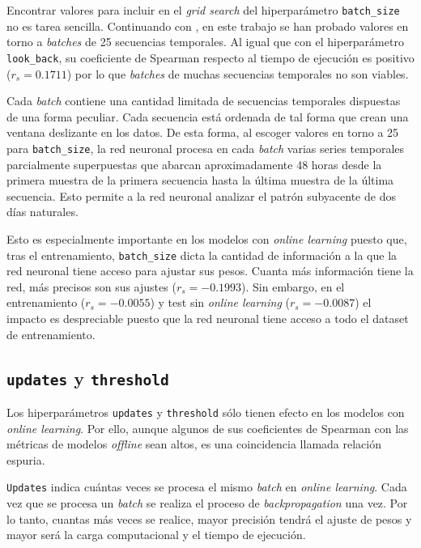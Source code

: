 Encontrar valores para incluir en el \textit{grid search} del hiperparámetro \texttt{batch\_size} no es tarea sencilla. Continuando con \cite{SKIMAcasaseca}, en este trabajo se han probado valores en torno a \textit{batches} de 25 secuencias temporales. Al igual que con el hiperparámetro \texttt{look\_back}, su coeficiente de Spearman respecto al tiempo de ejecución es positivo ($r_s=0.1711$) por lo que \textit{batches} de muchas secuencias temporales no son viables.


Cada \textit{batch} contiene una cantidad limitada de secuencias temporales dispuestas de una forma peculiar. Cada secuencia está ordenada de tal forma que crean una ventana deslizante en los datos. De esta forma, al escoger valores en torno a 25 para \texttt{batch\_size}, la red neuronal procesa en cada \textit{batch} varias series temporales parcialmente superpuestas que abarcan aproximadamente 48 horas desde la primera muestra de la primera secuencia hasta la última muestra de la última secuencia. Esto permite a la red neuronal analizar el patrón subyacente de dos días naturales.

Esto es especialmente importante en los modelos con \textit{online learning} puesto que, tras el entrenamiento, \texttt{batch\_size} dicta la cantidad de información a la que la red neuronal tiene acceso para ajustar sus pesos. Cuanta más información tiene la red, más precisos son sus ajustes ($r_s=-0.1993$). Sin embargo, en el entrenamiento ($r_s=-0.0055$) y test sin \textit{online learning} ($r_s=-0.0087$) el impacto es despreciable puesto que la red neuronal tiene acceso a todo el dataset de entrenamiento.

\subsection{\texttt{updates} y \texttt{threshold}}
Los hiperparámetros \texttt{updates} y \texttt{threshold} sólo tienen efecto en los modelos con \textit{online learning}. Por ello, aunque algunos de sus coeficientes de Spearman con las métricas de modelos \textit{offline} sean altos, es una coincidencia llamada relación espuria.

\texttt{Updates} indica cuántas veces se procesa el mismo \textit{batch} en \textit{online learning}. Cada vez que se procesa un \textit{batch} se realiza el proceso de \textit{backpropagation} una vez. Por lo tanto, cuantas más veces se realice, mayor precisión tendrá el ajuste de pesos y mayor será la carga computacional y el tiempo de ejecución.

